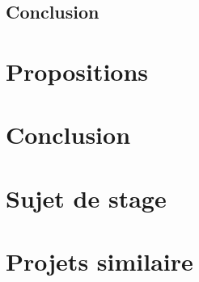 \documentclass[a4paper, 11pt]{report}
\begin{document}
\section{Conclusion}

\chapter{Propositions}

\chapter{Conclusion}

\appendix

\chapter{Sujet de stage}


\chapter{Projets similaire}

\listoffigures{}
\listoftables{}
\end{document}
